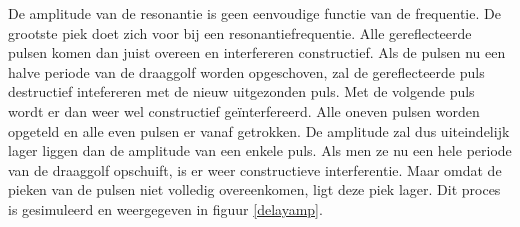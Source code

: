 De amplitude van de resonantie is geen eenvoudige functie van de frequentie.  
De grootste piek doet zich voor bij een resonantiefrequentie. Alle 
gereflecteerde pulsen komen dan juist overeen en interfereren constructief. Als 
de pulsen nu een halve periode van de draaggolf worden opgeschoven, zal de 
gereflecteerde puls destructief intefereren met de nieuw uitgezonden puls. Met 
de volgende puls wordt er dan weer wel constructief ge\"interfereerd. Alle 
oneven pulsen worden opgeteld en alle even pulsen er vanaf getrokken. De 
amplitude zal dus uiteindelijk lager liggen dan de amplitude van een enkele 
puls.  Als men ze nu een hele periode van de draaggolf opschuift, is er weer 
constructieve interferentie. Maar omdat de pieken van de pulsen niet volledig 
overeenkomen, ligt deze piek lager. Dit proces is gesimuleerd en weergegeven in 
figuur \ref{delayamp}.


